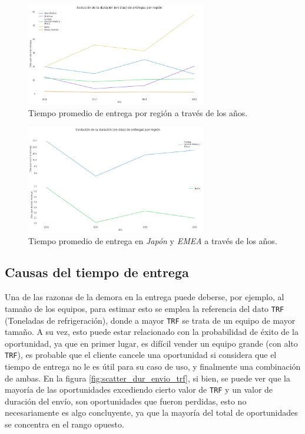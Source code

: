\documentclass[titlepage,a4paper]{article}
\begin{document}
\begin{figure}[H]
\centering
\includegraphics[width=0.7\textwidth]{images/lp_ev_duracion_tiempo_entrega_por_region.png}
\cprotect\caption{\label{fig:line_promedio_tiempo_entrega_region}Tiempo promedio de entrega por región a través de los años.}
\end{figure}

\begin{figure}[H]
\centering
\includegraphics[width=0.7\textwidth]{images/lp_ev_duracion_tiempo_entrega_por_region_japon_emea.png}
\cprotect\caption{\label{fig:promedio_tiempo_entrega_region_japon_EMEA}Tiempo promedio de entrega en \textit{Japón} y \textit{EMEA} a través de los años.}
\end{figure}

\subsection{Causas del tiempo de entrega}
Una de las razonas de la demora en la entrega puede deberse, por ejemplo, al tamaño de los equipos, para estimar esto se emplea la referencia del dato \verb|TRF| (Toneladas de refrigeración), donde a mayor \verb|TRF| se trata de un equipo de mayor tamaño. A su vez, esto puede estar relacionado con la probabilidad de éxito de la oportunidad, ya que en primer lugar, es difícil vender un equipo grande (con alto \verb|TRF|), es probable que el cliente cancele una oportunidad si considera que el tiempo de entrega no le es útil para su caso de uso, y finalmente una combinación de ambas. En la figura \ref{fig:scatter_dur_envio_trf}, si bien, se puede ver que la mayoría de las oportunidades excediendo cierto valor de \verb|TRF| y un valor de duración del envío, son oportunidades que fueron perdidas, esto no necesariamente es algo concluyente, ya que la mayoría del total de oportunidades se concentra en el rango opuesto.
\end{document}
